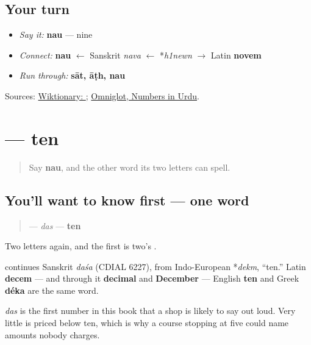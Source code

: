 \subsection*{Your turn}
\begin{itemize}
\raggedright
  \item \emph{Say it:} \textbf{nau} — nine
  \item \emph{Connect:} \textbf{nau} $\leftarrow$ Sanskrit \emph{nava} $\leftarrow$ *\emph{h1newn} $\to$ Latin \textbf{novem}
  \item \emph{Run through:} \textbf{sāt, āṭh, nau}
\end{itemize}

\begin{tcolorbox}[breakable,colback=teal!4,colframe=teal!35!black,title={Before you move on}]
Sources: \href{https://en.wiktionary.org/wiki/\%D9\%86\%D9\%88}{Wiktionary: }; \href{https://www.omniglot.com/language/numbers/urdu.htm}{Omniglot, Numbers in Urdu}.
\end{tcolorbox}
\section[\texorpdfstring{\ur{دس} (das)}{دس (das)}]{ — ten}

\label{lesson:UR-C29-das}



\begin{quote}
Say \textbf{nau}, and the other word its two letters can spell.
\end{quote}

\subsection*{You'll want to know first — one word}
\begin{quote}
\textbf{} — \emph{das} — \textbf{ten}
\end{quote}

Two letters again, and the first is two's \textbf{}.

\begin{cousinweb}
\textbf{} continues Sanskrit \emph{daśa} (CDIAL 6227), from Indo-European *\emph{dekm}, \textquotedblleft{}ten.\textquotedblright{} Latin \textbf{decem} — and through it \textbf{decimal} and \textbf{December} — English \textbf{ten} and Greek \textbf{déka} are the same word.

\emph{das} is the first number in this book that a shop is likely to say out loud. Very little is priced below ten, which is why a course stopping at five could name amounts nobody charges.
\end{cousinweb}

